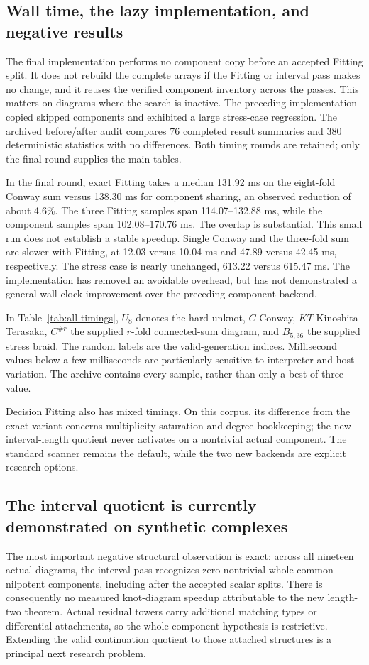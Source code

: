\subsection{Wall time, the lazy implementation, and negative results}
The final implementation performs no component copy before an accepted
Fitting split. It does not rebuild the complete arrays if the Fitting or
interval pass makes no change, and it reuses the verified component inventory
across the passes. This matters on diagrams where the search is inactive.
The preceding implementation copied skipped components and exhibited a large
stress-case regression. The archived before/after audit compares 76 completed
result summaries and 380 deterministic statistics with no differences. Both
timing rounds are retained; only the final round supplies the main tables.

In the final round, exact Fitting takes a median 131.92 ms on the eight-fold
Conway sum versus 138.30 ms for component sharing, an observed reduction of
about 4.6\%. The three Fitting samples span 114.07--132.88 ms, while the
component samples span 102.08--170.76 ms. The overlap is substantial. This
small run does not establish a stable speedup. Single Conway and the
three-fold sum are slower with Fitting, at 12.03 versus 10.04 ms and 47.89
versus 42.45 ms, respectively. The stress case is nearly unchanged, 613.22
versus 615.47 ms. The implementation has removed an avoidable overhead, but
has not demonstrated a general wall-clock improvement over the preceding
component backend.

{\small}

In Table~\ref{tab:all-timings}, $U_8$ denotes the hard unknot, $C$ Conway,
$KT$ Kinoshita--Terasaka, $C^{\#r}$ the supplied $r$-fold connected-sum
diagram, and $B_{5,36}$ the supplied stress braid. The random labels are the
valid-generation indices. Millisecond values below a few milliseconds are
particularly sensitive to interpreter and host variation. The archive
contains every sample, rather than only a best-of-three value.

Decision Fitting also has mixed timings. On this corpus, its difference from
the exact variant concerns multiplicity saturation and degree bookkeeping;
the new interval-length quotient never activates on a nontrivial actual
component. The standard scanner remains the default, while the two new
backends are explicit research options.

\subsection{The interval quotient is currently demonstrated on synthetic complexes}
The most important negative structural observation is exact: across all
nineteen actual diagrams, the interval pass recognizes zero nontrivial whole
common-nilpotent components, including after the accepted scalar splits.
There is consequently no measured knot-diagram speedup attributable to the
new length-two theorem. Actual residual towers carry additional matching
types or differential attachments, so the whole-component hypothesis is
restrictive. Extending the valid continuation quotient to those attached
structures is a principal next research problem.

